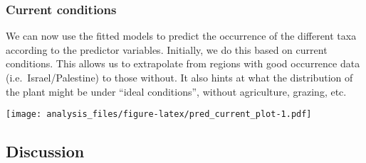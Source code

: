 \documentclass[]{article}
\begin{document}
\hypertarget{current-conditions}{%
\subsubsection{Current conditions}\label{current-conditions}}

We can now use the fitted models to predict the occurrence of the
different taxa according to the predictor variables. Initially, we do
this based on current conditions. This allows us to extrapolate from
regions with good occurrence data (i.e.~Israel/Palestine) to those
without. It also hints at what the distribution of the plant might be
under ``ideal conditions'', without agriculture, grazing, etc.

\texttt{[image: analysis\_files/figure-latex/pred\_current\_plot-1.pdf]}

\hypertarget{discussion}{%
\subsection{Discussion}\label{discussion}}
\end{document}
